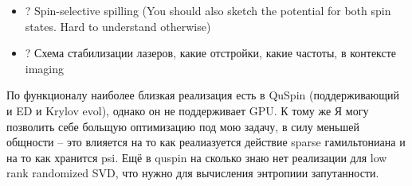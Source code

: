 \begin{itemize}
	\item ? Spin-selective spilling (You should also sketch the potential for both spin states. Hard to understand otherwise)
	\item ? Схема стабилизации лазеров, какие отстройки, какие частоты, в контексте imaging
\end{itemize}


По функционалу наиболее близкая реализация есть в QuSpin (поддерживающий и ED и Krylov evol), однако он не поддерживает GPU. К тому же Я могу позволить себе больщую оптимизацию под мою задачу, в силу меньшей общности -- это влияется на то как реалиазуется действие sparse гамильтониана и на то как хранится psi. Ещё в quspin на сколько знаю нет реализации для low rank randomized SVD, что нужно для вычисления энтропиии запутанности.






